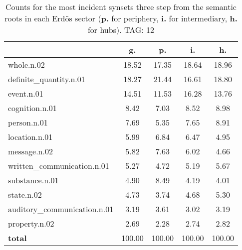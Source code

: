 \begin{table}[h!]
\begin{center}
\begin{tabular}{| l | c | c | c | c |}\hline
 & g. & p. & i. & h. \\\hline
whole.n.02 & 18.52  & 17.35  & 18.64  & 18.96 \\\hline
definite\_quantity.n.01 & 18.27  & 21.44  & 16.61  & 18.80 \\\hline
event.n.01 & 14.51  & 11.53  & 16.28  & 13.76 \\\hline
cognition.n.01 & 8.42  & 7.03  & 8.52  & 8.98 \\\hline
person.n.01 & 7.69  & 5.35  & 7.65  & 8.91 \\\hline
location.n.01 & 5.99  & 6.84  & 6.47  & 4.95 \\\hline
message.n.02 & 5.82  & 7.63  & 6.02  & 4.66 \\\hline
written\_communication.n.01 & 5.27  & 4.72  & 5.19  & 5.67 \\\hline
substance.n.01 & 4.90  & 8.49  & 4.19  & 4.01 \\\hline
state.n.02 & 4.73  & 3.74  & 4.68  & 5.30 \\\hline
auditory\_communication.n.01 & 3.19  & 3.61  & 3.02  & 3.19 \\\hline
property.n.02 & 2.69  & 2.28  & 2.74  & 2.82 \\\hline
{{\bf total}} & 100.00  & 100.00  & 100.00  & 100.00 \\\hline
\end{tabular}
\caption{Counts for the most incident synsets three step from the semantic roots in each Erd\"os sector ({\bf p.} for periphery, {\bf i.} for intermediary, {\bf h.} for hubs). TAG: 12}
\end{center}
\end{table}